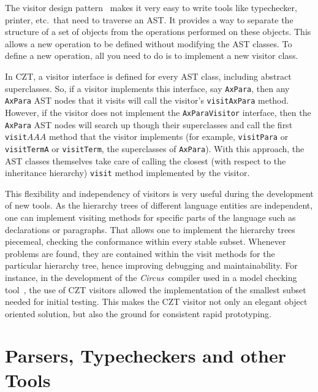 \documentclass{llncs}
\newcommand{\Circus}{{\sf\slshape Circus}}
\newcommand{\Interface}[1]{\texttt{#1}}
\newcommand{\Method}[1]{\texttt{#1}}
\begin{document}
  The visitor design pattern~\cite{GamEA:95,MaiCha:01} makes it very
  easy to write tools like typechecker, printer, etc.\ that need to
  traverse an AST. It provides a way to separate the structure of a
  set of objects from the operations performed on these objects.  This
  allows a new operation to be defined without modifying the AST
  classes.  To define a new operation, all you need to do is to
  implement a new visitor class.

  In CZT, a visitor interface is defined for every AST class,
  including abstract superclasses.  So, if a visitor implements this
  interface, say \Interface{AxPara}, then any \Interface{AxPara} AST
  nodes that it visits will call the visitor's \Method{visitAxPara}
  method.  However, if the visitor does not implement the
  \Interface{AxParaVisitor} interface, then the \Interface{AxPara} AST
  nodes will search up though their superclasses and call the first
  \Method{visit$AAA$} method that the visitor implements (for example,
  \Interface{visitPara} or \Interface{visitTermA} or
  \Interface{visitTerm}, the superclasses of \Interface{AxPara}).
  With this approach, the AST classes themselves take care of calling
  the closest (with respect to the inheritance hierarchy)
  \Method{visit} method implemented by the visitor.

  This flexibility and independency of visitors is very useful during
  the development of new tools.  As the hierarchy trees of different
  language entities are independent, one can implement visiting
  methods for specific parts of the language such as declarations or
  paragraphs.  That allows one to implement the hierarchy trees
  piecemeal, checking the conformance within every stable subset.
  Whenever problems are found, they are contained within the visit
  methods for the particular hierarchy tree, hence improving debugging
  and maintainability.  For instance, in the development of the
  \Circus\ compiler used in a model checking
  tool~\cite{circus.mc:leo}, the use of CZT visitors allowed the
  implementation of the smallest subset needed for initial testing.
  This makes the CZT visitor not only an elegant object oriented
  solution, but also the ground for consistent rapid prototyping.

\section{Parsers, Typecheckers and other Tools}
\end{document}
